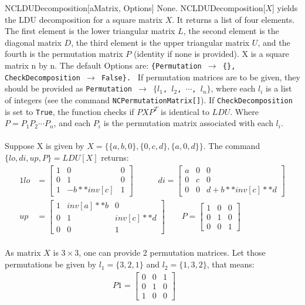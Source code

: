 \CommandEntry
{NCLDUDecomposition[aMatrix, Options]}
{None.}
{NCLDUDecomposition[$X$] yields the LDU decomposition for a square matrix $X$. 
It returns a list of four elements. The first element is the
lower triangular matrix $L$, the second element is the diagonal matrix $D$,
the third element is the upper triangular matrix $U$, and the fourth is
the permutation matrix $P$ (identity if none is provided).}
{X is a square matrix n by n. The default Options are: 
{\tt \{Permuta\-tion $\rightarrow$ \{\}, 
CheckDecomposition  $\rightarrow$ False\}. }
If permutation matrices are to be given, they should be provided 
as {\tt Permutation  $\rightarrow$ $\{l_1$, $l_2$, $\cdots$, $l_n\}$}, 
where each $l_i$ is a list of integers (see the command 
{\tt NCPermu\-tation\-Matrix[]}). 
If {\tt CheckDecomposition} is set to {\tt True}, the function checks 
if $P X P^T$ is identical to $L D U$. Where $P=P_1 P_2 \cdots P_n$, 
and each $P_i$ is the permutation matrix associated with each $l_i$.\\ \\
Suppose X is given by $X = \{ \{ a,b,0\} ,\{ 0,c,d\} ,\{ a,0,d\} \}$. The 
command $\{lo, di, up, P\} = LDU[X]$ returns:
{\footnotesize
\begin{alignat*}{1} 
lo &= \begin{bmatrix}1&0&0\\0&1&0\\1&-b**inv[c]&1\end{bmatrix}\quad\qquad
di = \begin{bmatrix}a&0&0\\0&c&0\\0& 0&d+b**inv[c]**d\end{bmatrix}\\
up &= \begin{bmatrix}1&inv[a]**b& 0\\0&1&inv[c]**d\\0&0&1\end{bmatrix}\qquad
P = \begin{bmatrix}1&0&0\\0&1&0\\0&0&1\end{bmatrix}
\end{alignat*} } \\
As matrix $X$ is $3\times 3$, one can provide 2 permutation matrices. Let 
those permutations be given by $l_1 = \{3,2,1\}$ and $l_2 = \{ 1,3,2\}$, 
that means:
{\footnotesize
\begin{gather*}
P1 = \begin{bmatrix}0&0&1\\0&1&0\\1&0&0\end{bmatrix}\qquad

\end{gather*}}}
